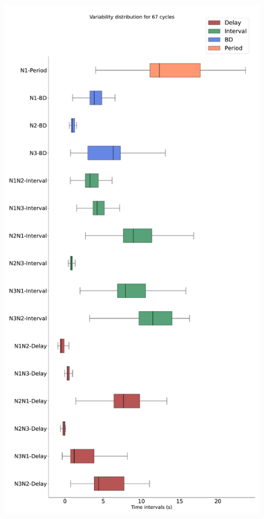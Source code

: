 \begin{figure}[htbp]
\begin{minipage}{0.9\textwidth}
\begin{minipage}[b]{0.45\textwidth}
			\includegraphics[width=\textwidth]{./invariants/data/SUSSEX/prep3/images/prep3_3phases_boxplot.pdf}
		\end{minipage}
		\begin{minipage}[b]{0.53\textwidth}
			\centering

\end{minipage}
\end{minipage}
\end{figure}
